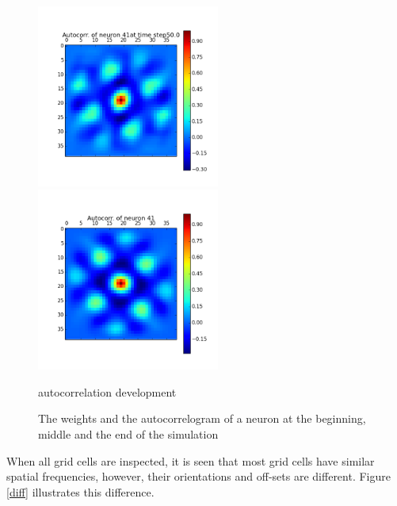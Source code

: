 \documentclass[a4paper, 12pt]{article}
\begin{document}
\begin{figure}[htbp]
\begin{minipage}[hbt]{0,49\textwidth}
\includegraphics[width=6cm,height=6cm]{neurons/neuron_a_41_t_50.png}\\[10pt]
\includegraphics[width=6cm,height=6cm]{neurons/neuron_a_41.png}
        \caption{autocorrelation development}
        \label{LabelB}
\end{minipage}
\centering
\caption{The weights and the autocorrelogram of a neuron at the beginning, middle and the end of the simulation}
\label{time-evol}
\end{figure}

When all grid cells are inspected, it is seen that most grid cells have similar spatial frequencies, however, their orientations and off-sets are different. Figure \ref{diff} illustrates this difference. 
\end{document}

